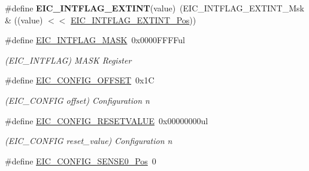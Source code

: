 \begin{DoxyCompactItemize}
\item 
\hypertarget{group___s_a_m_l21___e_i_c_ga9be0394a7b0f0deed1340527b6485f5c}{}\#define {\bfseries E\+I\+C\+\_\+\+I\+N\+T\+F\+L\+A\+G\+\_\+\+E\+X\+T\+I\+N\+T}(value)~(E\+I\+C\+\_\+\+I\+N\+T\+F\+L\+A\+G\+\_\+\+E\+X\+T\+I\+N\+T\+\_\+\+Msk \& ((value) $<$$<$ \hyperlink{group___s_a_m_l21___e_i_c_gadcbc791cf87b0cbd60e76f1958249501}{E\+I\+C\+\_\+\+I\+N\+T\+F\+L\+A\+G\+\_\+\+E\+X\+T\+I\+N\+T\+\_\+\+Pos}))\label{group___s_a_m_l21___e_i_c_ga9be0394a7b0f0deed1340527b6485f5c}

\item 
\hypertarget{group___s_a_m_l21___e_i_c_ga81b4c53bcfec0717a26cde921d364062}{}\#define \hyperlink{group___s_a_m_l21___e_i_c_ga81b4c53bcfec0717a26cde921d364062}{E\+I\+C\+\_\+\+I\+N\+T\+F\+L\+A\+G\+\_\+\+M\+A\+S\+K}~0x0000\+F\+F\+F\+Ful\label{group___s_a_m_l21___e_i_c_ga81b4c53bcfec0717a26cde921d364062}

\begin{DoxyCompactList}\small\item\em (E\+I\+C\+\_\+\+I\+N\+T\+F\+L\+A\+G) M\+A\+S\+K Register \end{DoxyCompactList}\item 
\hypertarget{group___s_a_m_l21___e_i_c_ga35ff22e6265c54180a3967466b95361a}{}\#define \hyperlink{group___s_a_m_l21___e_i_c_ga35ff22e6265c54180a3967466b95361a}{E\+I\+C\+\_\+\+C\+O\+N\+F\+I\+G\+\_\+\+O\+F\+F\+S\+E\+T}~0x1\+C\label{group___s_a_m_l21___e_i_c_ga35ff22e6265c54180a3967466b95361a}

\begin{DoxyCompactList}\small\item\em (E\+I\+C\+\_\+\+C\+O\+N\+F\+I\+G offset) Configuration n \end{DoxyCompactList}\item 
\hypertarget{group___s_a_m_l21___e_i_c_gafa5a8efe9b088c3ef448f32bf86d537d}{}\#define \hyperlink{group___s_a_m_l21___e_i_c_gafa5a8efe9b088c3ef448f32bf86d537d}{E\+I\+C\+\_\+\+C\+O\+N\+F\+I\+G\+\_\+\+R\+E\+S\+E\+T\+V\+A\+L\+U\+E}~0x00000000ul\label{group___s_a_m_l21___e_i_c_gafa5a8efe9b088c3ef448f32bf86d537d}

\begin{DoxyCompactList}\small\item\em (E\+I\+C\+\_\+\+C\+O\+N\+F\+I\+G reset\+\_\+value) Configuration n \end{DoxyCompactList}\item 
\hypertarget{group___s_a_m_l21___e_i_c_ga9a191a13be42b2e0283c890d9302f461}{}\#define \hyperlink{group___s_a_m_l21___e_i_c_ga9a191a13be42b2e0283c890d9302f461}{E\+I\+C\+\_\+\+C\+O\+N\+F\+I\+G\+\_\+\+S\+E\+N\+S\+E0\+\_\+\+Pos}~0\label{group___s_a_m_l21___e_i_c_ga9a191a13be42b2e0283c890d9302f461}


\end{DoxyCompactItemize}
